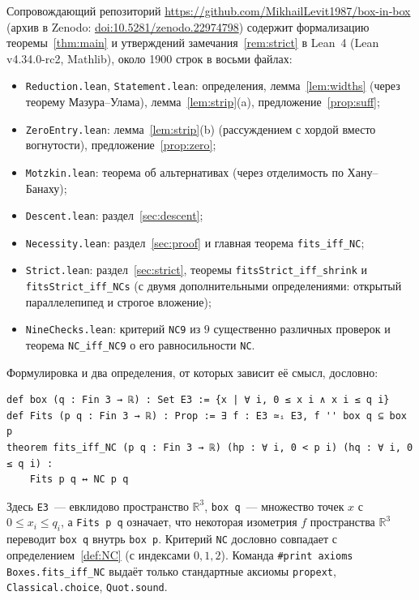\documentclass[11pt]{article}
\theoremstyle{definition}
\theoremstyle{remark}
\newcommand{\R}{\mathbb{R}}
\begin{document}
Сопровождающий репозиторий \url{https://github.com/MikhailLevit1987/box-in-box} (архив в Zenodo: \href{https://doi.org/10.5281/zenodo.22974798}{doi:10.5281/zenodo.22974798}) содержит формализацию теоремы~\ref{thm:main} и утверждений
замечания~\ref{rem:strict} в Lean~4 (Lean v4.34.0-rc2, Mathlib), около 1900 строк в восьми файлах:
\begin{itemize}
\item \texttt{Reduction.lean}, \texttt{Statement.lean}: определения, лемма~\ref{lem:widths} (через
теорему Мазура--Улама), лемма~\ref{lem:strip}(a), предложение~\ref{prop:suff};
\item \texttt{ZeroEntry.lean}: лемма~\ref{lem:strip}(b) (рассуждением с хордой вместо вогнутости),
предложение~\ref{prop:zero};
\item \texttt{Motzkin.lean}: теорема об альтернативах (через отделимость по Хану--Банаху);
\item \texttt{Descent.lean}: раздел~\ref{sec:descent};
\item \texttt{Necessity.lean}: раздел~\ref{sec:proof} и главная теорема \texttt{fits\_iff\_NC};
\item \texttt{Strict.lean}: раздел~\ref{sec:strict}, теоремы \texttt{fitsStrict\_iff\_shrink} и
\texttt{fitsStrict\_iff\_NCs} (с двумя дополнительными определениями: открытый параллелепипед и
строгое вложение);
\item \texttt{NineChecks.lean}: критерий \texttt{NC9} из $9$ существенно различных проверок и теорема
\texttt{NC\_iff\_NC9} о его равносильности \texttt{NC}.
\end{itemize}
Формулировка и два определения, от которых зависит её смысл, дословно:
\begin{verbatim}
def box (q : Fin 3 → ℝ) : Set E3 := {x | ∀ i, 0 ≤ x i ∧ x i ≤ q i}
def Fits (p q : Fin 3 → ℝ) : Prop := ∃ f : E3 ≃ᵢ E3, f '' box q ⊆ box p
theorem fits_iff_NC (p q : Fin 3 → ℝ) (hp : ∀ i, 0 < p i) (hq : ∀ i, 0 ≤ q i) :
    Fits p q ↔ NC p q
\end{verbatim}
Здесь \texttt{E3}~--- евклидово пространство $\R^3$, \texttt{box q}~--- множество точек $x$ с
$0\le x_i\le q_i$, а \texttt{Fits p q} означает, что некоторая изометрия $f$ пространства $\R^3$
переводит \texttt{box q} внутрь \texttt{box p}. Критерий \texttt{NC} дословно совпадает с
определением~\ref{def:NC} (с индексами $0,1,2$). Команда \texttt{\#print axioms Boxes.fits\_iff\_NC}
выдаёт только стандартные аксиомы \texttt{propext}, \texttt{Classical.choice}, \texttt{Quot.sound}.
\end{document}
